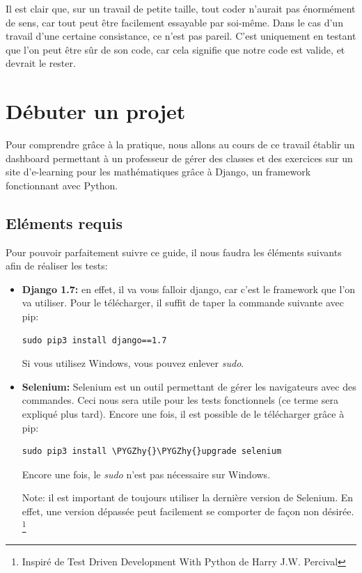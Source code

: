 \documentclass[letterpaper,10pt,french]{sphinxmanual}
\def\PYGZhy{\char`\-}
\begin{document}
Il est clair que, sur un travail de petite taille, tout coder n'aurait pas
énormément de sens, car tout peut être facilement essayable par soi-même.
Dans le cas d'un travail d'une certaine consistance, ce n'est pas pareil.
C'est uniquement en testant que l'on peut être sûr de son code, car cela
signifie que notre code est valide, et devrait le rester.


\chapter{Débuter un projet}
\label{projet1:debuter-un-projet}\label{projet1::doc}
Pour comprendre grâce à la pratique, nous allons au cours de ce travail établir un dashboard permettant à un
professeur de gérer des classes et des exercices sur un site d'e-learning pour les mathématiques grâce à Django, un framework fonctionnant avec Python.


\section{Eléments requis}
\label{projet1:elements-requis}
Pour pouvoir parfaitement suivre ce guide, il nous faudra les éléments suivants afin de réaliser les tests:
\begin{itemize}
\item {} 
\textbf{Django 1.7:} en effet, il va vous falloir django, car c'est le framework que l'on va utiliser. Pour le télécharger,
il suffit de taper la commande suivante avec pip:

\begin{Verbatim}[commandchars=\\\{\}]
sudo pip3 install django==1.7
\end{Verbatim}

Si vous utilisez Windows, vous pouvez enlever \emph{sudo}.

\item {} 
\textbf{Selenium:} Selenium est un outil permettant de gérer les navigateurs avec des commandes. Ceci nous sera utile pour les
tests fonctionnels (ce terme sera expliqué plus tard). Encore une fois, il est possible de le télécharger grâce à pip:

\begin{Verbatim}[commandchars=\\\{\}]
sudo pip3 install \PYGZhy{}\PYGZhy{}upgrade selenium
\end{Verbatim}

Encore une fois, le \emph{sudo} n'est pas nécessaire sur Windows.

Note: il est important de toujours utiliser la dernière version de Selenium. En effet, une version dépassée peut facilement se comporter de
façon non désirée. \footnote{
Inspiré de Test Driven Development With Python de Harry J.W. Percival
}

\end{itemize}
\end{document}
